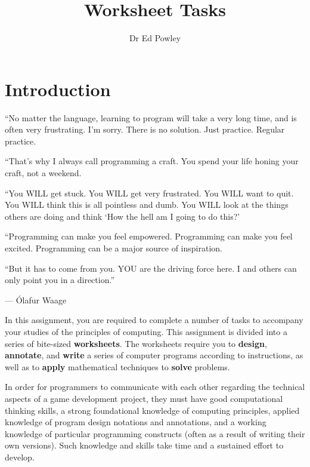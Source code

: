 \documentclass{../../fal_assignment}
\title{Worksheet Tasks}
\author{Dr Ed Powley}
\begin{document}
\maketitle

\section*{Introduction}

\begin{marginquote}
``No matter the language, learning to program will take a very long time, and is often very frustrating. I'm sorry. There is no solution. Just practice. Regular practice.

``That's why I always call programming a craft. You spend your life honing your craft, not a weekend.

``You WILL get stuck.
You WILL get very frustrated.
You WILL want to quit.
You WILL think this is all pointless and dumb.
You WILL look at the things others are doing and think `How the hell am I going to do this?'

``Programming can make you feel empowered.
Programming can make you feel excited.
Programming can be a major source of inspiration.

``But it has to come from you. YOU are the driving force here. I and others can only point you in a direction.''

\par --- \'Olafur Waage
\end{marginquote}

In this assignment, you are required to complete a number of tasks to accompany your studies of the principles of computing. This assignment is divided into a series of bite-sized \textbf{worksheets}. The worksheets require you to \textbf{design}, \textbf{annotate}, and \textbf{write} a series of computer programs according to instructions, as well as to \textbf{apply} mathematical techniques to \textbf{solve} problems.

In order for programmers to communicate with each other regarding the technical aspects of a game development project, they must have good computational thinking skills, a strong foundational knowledge of computing principles, applied knowledge of program design notations and annotations, and a working knowledge of particular programming constructs (often as a result of writing their own versions). Such knowledge and skills take time and a sustained effort to develop.
\end{document}

